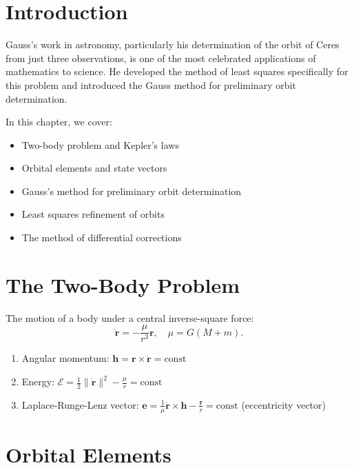 \section{Introduction}

Gauss's work in astronomy, particularly his determination of the orbit of Ceres from just three observations, is one of the most celebrated applications of mathematics to science. He developed the method of least squares specifically for this problem and introduced the Gauss method for preliminary orbit determination.

In this chapter, we cover:
\begin{itemize}
    \item Two-body problem and Kepler's laws
    \item Orbital elements and state vectors
    \item Gauss's method for preliminary orbit determination
    \item Least squares refinement of orbits
    \item The method of differential corrections
\end{itemize}

\section{The Two-Body Problem}

The motion of a body under a central inverse-square force:
\[
\ddot{\mathbf{r}} = -\frac{\mu}{r^3} \mathbf{r}, \quad \mu = G(M+m).
\]

\begin{theorem}
\begin{enumerate}
    \item Angular momentum: $\mathbf{h} = \mathbf{r} \times \dot{\mathbf{r}} = \text{const}$
    \item Energy: $\mathcal{E} = \frac{1}{2} \|\dot{\mathbf{r}}\|^2 - \frac{\mu}{r} = \text{const}$
    \item Laplace-Runge-Lenz vector: $\mathbf{e} = \frac{1}{\mu} \dot{\mathbf{r}} \times \mathbf{h} - \frac{\mathbf{r}}{r} = \text{const}$ (eccentricity vector)
\end{enumerate}
\end{theorem}

\section{Orbital Elements}

